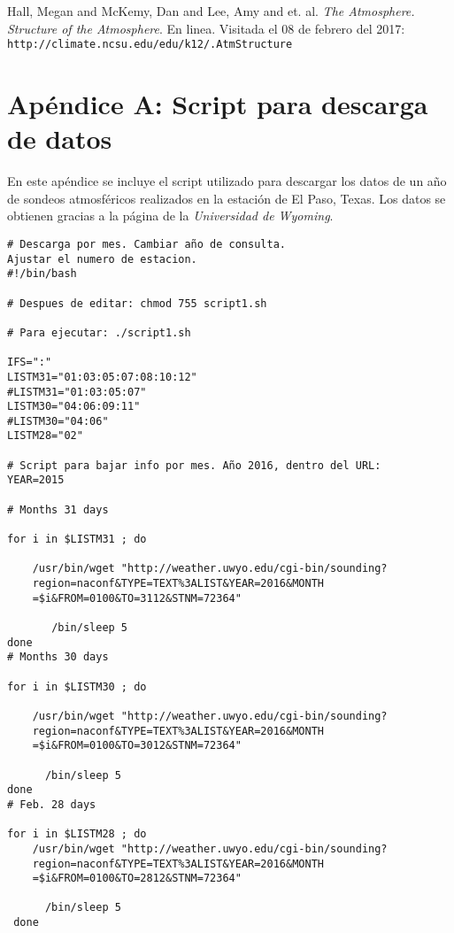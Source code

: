 \documentclass[12pt]{article}
\begin{document}
\begin{thebibliography}{9}
Hall, Megan and McKemy, Dan and Lee, Amy and et. al.
\textit{The Atmosphere. Structure of the Atmosphere}. En linea. Visitada el 08 de febrero del 2017:
\\\texttt{http://climate.ncsu.edu/edu/k12/.AtmStructure}

\end{thebibliography}

\newpage

\section{Apéndice A: Script para descarga de datos}
\label{fig:A}

En este apéndice se incluye el script utilizado para descargar los datos de un año de sondeos atmosféricos realizados en la estación de El Paso, Texas. Los datos se obtienen gracias a la página de la \textit{Universidad de Wyoming}.

\begin{verbatim}
# Descarga por mes. Cambiar año de consulta. 
Ajustar el numero de estacion.
#!/bin/bash

# Despues de editar: chmod 755 script1.sh

# Para ejecutar: ./script1.sh

IFS=":"
LISTM31="01:03:05:07:08:10:12"
#LISTM31="01:03:05:07"
LISTM30="04:06:09:11"
#LISTM30="04:06"
LISTM28="02"

# Script para bajar info por mes. Año 2016, dentro del URL:
YEAR=2015

# Months 31 days

for i in $LISTM31 ; do

    /usr/bin/wget "http://weather.uwyo.edu/cgi-bin/sounding?
    region=naconf&TYPE=TEXT%3ALIST&YEAR=2016&MONTH
    =$i&FROM=0100&TO=3112&STNM=72364"

       /bin/sleep 5
done
# Months 30 days

for i in $LISTM30 ; do

    /usr/bin/wget "http://weather.uwyo.edu/cgi-bin/sounding?
    region=naconf&TYPE=TEXT%3ALIST&YEAR=2016&MONTH
    =$i&FROM=0100&TO=3012&STNM=72364"
      
      /bin/sleep 5
done
# Feb. 28 days

for i in $LISTM28 ; do
    /usr/bin/wget "http://weather.uwyo.edu/cgi-bin/sounding?
    region=naconf&TYPE=TEXT%3ALIST&YEAR=2016&MONTH
    =$i&FROM=0100&TO=2812&STNM=72364"
      
      /bin/sleep 5
 done
\end{verbatim}
\end{document}
